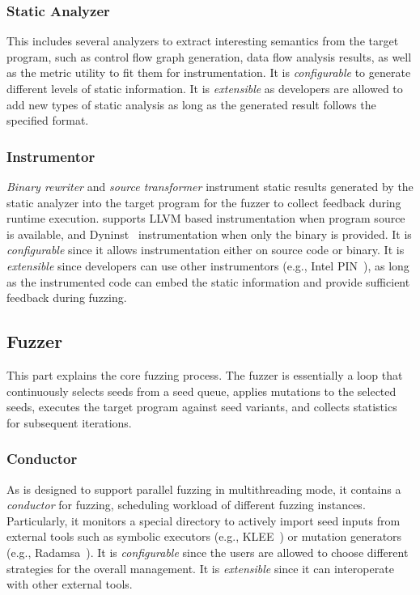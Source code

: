 \subsubsection{Static Analyzer}\label{sec:static_analysis}
This includes several analyzers to extract interesting semantics from the target program, such as control flow graph generation, data flow analysis results, as well as the metric utility to fit them for instrumentation.
It is \textit{configurable} to generate different levels of static information. It is \textit{extensible} as developers are allowed to add new types of static analysis as long as the generated result follows the specified format.


\subsubsection{Instrumentor}
\emph{Binary rewriter} and \emph{source transformer} instrument static results generated by the static analyzer into the target program for the fuzzer to collect feedback during runtime execution.
{\FOT} supports LLVM based instrumentation when program source is available, and Dyninst~\cite{dyninst} instrumentation when only the binary is provided.
It is \textit{configurable} since it allows instrumentation either on source code or binary.
It is \textit{extensible} since developers can use other instrumentors (e.g., Intel PIN~\cite{pin}), as long as the instrumented code can embed the static information and provide sufficient feedback during fuzzing.

\subsection{Fuzzer}
This part explains the core fuzzing process. 
The fuzzer is essentially a loop that continuously selects seeds from a seed queue, applies mutations to the selected seeds, executes the target program against seed variants, and collects statistics for subsequent iterations.

\subsubsection{Conductor}
As {\FOT} is designed to support parallel fuzzing in multithreading mode, it contains a \emph{conductor} for fuzzing, scheduling workload of different fuzzing instances.
Particularly, it monitors a special directory to actively import seed inputs from external tools such as symbolic executors (e.g., KLEE~\cite{klee}) or mutation generators (e.g., Radamsa~\cite{radamsa}).
It is \textit{configurable} since the users are allowed to choose different strategies for the overall management.
It is \textit{extensible} since it can interoperate with other external tools.


